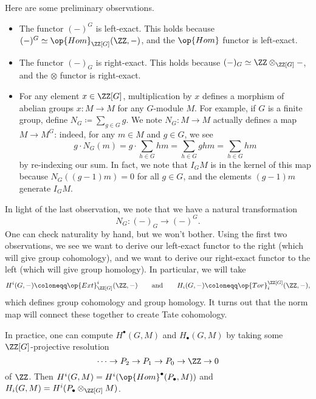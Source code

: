 \documentclass[../notes.tex]{subfiles}
\begin{document}
Here are some preliminary observations.
\begin{itemize}
	\item The functor $(-)^G$ is left-exact. This holds because $(-)^G\simeq\op{Hom}_{\ZZ[G]}(\ZZ,-)$, and the $\op{Hom}$ functor is left-exact.
	\item The functor $(-)_G$ is right-exact. This holds because $(-)_G\simeq\ZZ\otimes_{\ZZ[G]}-$, and the $\otimes$ functor is right-exact.
	\item For any element $x\in\ZZ[G]$, multiplication by $x$ defines a morphism of abelian groups $x\colon M\to M$ for any $G$-module $M$. For example, if $G$ is a finite group, define $N_G\coloneqq\sum_{g\in G}g$. We note $N_G\colon M\to M$ actually defines a map $M\to M^G$: indeed, for any $m\in M$ and $g\in G$, we see
	\[g\cdot N_G(m)=g\cdot\sum_{h\in G}hm=\sum_{h\in G}ghm=\sum_{h\in G}hm\]
	by re-indexing our sum. In fact, we note that $I_GM$ is in the kernel of this map because $N_G((g-1)m)=0$ for all $g\in G$, and the elements $(g-1)m$ generate $I_GM$.
\end{itemize}
In light of the last observation, we note that we have a natural transformation
\[N_G\colon(-)_G\to(-)^G.\]
One can check naturality by hand, but we won't bother. Using the first two observations, we see we want to derive our left-exact functor to the right (which will give group cohomology), and we want to derive our right-exact functor to the left (which will give group homology). In particular, we will take
\[H^i(G,-)\coloneqq\op{Ext}^i_{\ZZ[G]}(\ZZ,-)\qquad\text{and}\qquad H_i(G,-)\coloneqq\op{Tor}_i^{\ZZ[G]}(\ZZ,-),\]
which defines group cohomology and group homology. It turns out that the norm map will connect these together to create Tate cohomology.
\begin{remark} \label{rem:compute-cohom}
	In practice, one can compute $H^\bullet(G,M)$ and $H_\bullet(G,M)$ by taking some $\ZZ[G]$-projective resolution
	\[\cdots\to P_2\to P_1\to P_0\to\ZZ\to0\]
	of $\ZZ$. Then $H^i(G,M)=H^i(\op{Hom}^\bullet(P_\bullet,M))$ and $H_i(G,M)=H^i(P_\bullet\otimes_{\ZZ[G]}M)$.
\end{remark}
\end{document}

